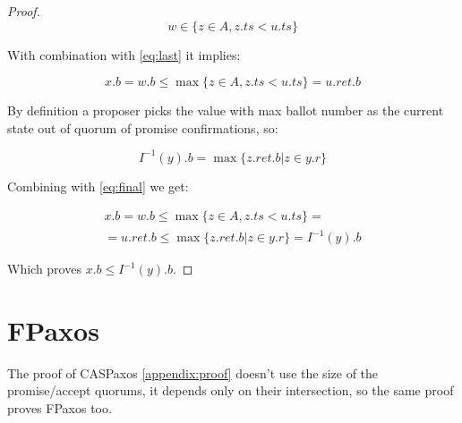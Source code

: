 \documentclass[12pt]{article}
\theoremstyle{definition}
\begin{document}
\begin{appendices}
\begin{proof}
  \begin{equation}
    w \in \{ z \in A, z.ts < u.ts \}
  \end{equation}

  With combination with \ref{eq:last} it implies:

  \begin{equation} \label{eq:final}
    x.b = w.b \leq \max \{ z \in A, z.ts < u.ts \} = u.ret.b
  \end{equation}

  By definition a proposer picks the value with max ballot number as the current state out of quorum of promise confirmations, so:

  \begin{equation}
    I^{-1}(y).b = \max \{ z.ret.b | z \in y.r \}
  \end{equation}

  Combining with \ref{eq:final} we get:

  \begin{multline}
    x.b = w.b \leq \max \{ z \in A, z.ts < u.ts \} = \\
    = u.ret.b \leq \max \{ z.ret.b | z \in y.r \} = I^{-1}(y).b
  \end{multline}

  Which proves $x.b \leq I^{-1}(y).b$.

\end{proof}

\section{FPaxos}
\label{appendix:fpaxos}
The proof of CASPaxos \ref{appendix:proof} doesn't use the size of the promise/accept quorums, it depends only on their intersection, so the same proof proves FPaxos too.

\end{appendices}
\end{document}
